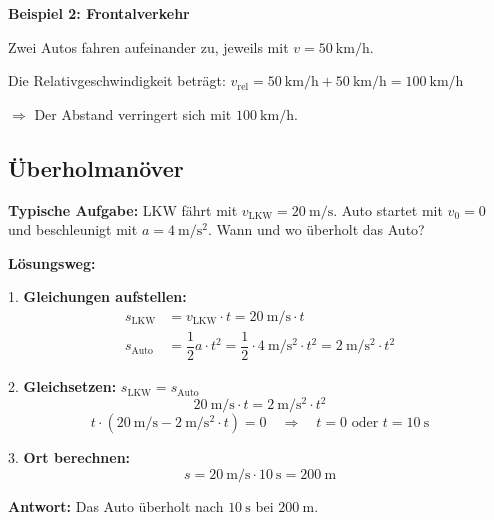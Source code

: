 \documentclass[11pt, a4paper]{article}
\begin{document}
\begin{beispielbox}
\textbf{Beispiel 2: Frontalverkehr}

Zwei Autos fahren aufeinander zu, jeweils mit $v = \SI{50}{\kilo\metre\per\hour}$.

Die Relativgeschwindigkeit beträgt: $v_{\text{rel}} = \SI{50}{\kilo\metre\per\hour} + \SI{50}{\kilo\metre\per\hour} = \SI{100}{\kilo\metre\per\hour}$

$\Rightarrow$ Der Abstand verringert sich mit $\SI{100}{\kilo\metre\per\hour}$.
\end{beispielbox}

\subsection{Überholmanöver}

\begin{beispielbox}
\textbf{Typische Aufgabe:} LKW fährt mit $v_{\text{LKW}} = \SI{20}{\metre\per\second}$. Auto startet mit $v_0 = 0$ und beschleunigt mit $a = \SI{4}{\metre\per\second\squared}$. Wann und wo überholt das Auto?

\textbf{Lösungsweg:}

1. \textbf{Gleichungen aufstellen:}
\begin{align*}
    s_{\text{LKW}} &= v_{\text{LKW}} \cdot t = \SI{20}{\metre\per\second} \cdot t \\
    s_{\text{Auto}} &= \dfrac{1}{2} a \cdot t^2 = \dfrac{1}{2} \cdot \SI{4}{\metre\per\second\squared} \cdot t^2 = \SI{2}{\metre\per\second\squared} \cdot t^2
\end{align*}

2. \textbf{Gleichsetzen:} $s_{\text{LKW}} = s_{\text{Auto}}$
$$\SI{20}{\metre\per\second} \cdot t = \SI{2}{\metre\per\second\squared} \cdot t^2$$
$$t \cdot (\SI{20}{\metre\per\second} - \SI{2}{\metre\per\second\squared} \cdot t) = 0 \quad \Rightarrow \quad t = 0 \text{ oder } t = \SI{10}{\second}$$

3. \textbf{Ort berechnen:}
$$s = \SI{20}{\metre\per\second} \cdot \SI{10}{\second} = \SI{200}{\metre}$$

\textbf{Antwort:} Das Auto überholt nach $\SI{10}{\second}$ bei $\SI{200}{\metre}$.
\end{beispielbox}

\newpage

\end{document}
